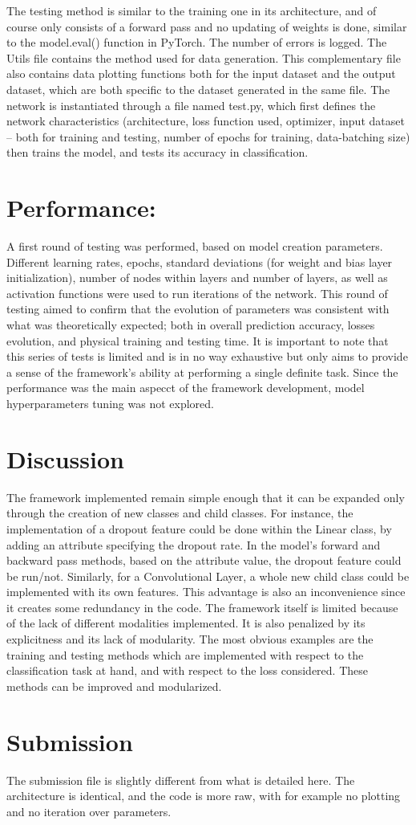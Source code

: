 \documentclass[10pt, a4paper]{article}
\begin{document}
The testing method is similar to the training one in its architecture, and of course only consists of a forward pass and no updating of weights is done, similar to the model.eval() function in PyTorch. The number of errors is logged. 
The Utils file contains the method used for data generation. This complementary file also contains data plotting functions both for the input dataset and the output dataset, which are both specific to the dataset generated in the same file.
The network is instantiated through a file named test.py, which first defines the network characteristics (architecture, loss function used, optimizer, input dataset -- both for training and testing, number of epochs for training, data-batching size) then trains the model, and tests its accuracy in classification. 


\section{Performance:}A first round of testing was performed, based on model creation parameters. Different  learning rates, epochs, standard deviations (for weight and bias layer initialization), number of nodes within layers and number of layers, as well as activation functions were used to run iterations of the network. This round of testing aimed to confirm that the evolution of parameters was consistent with what was theoretically expected; both in overall prediction accuracy, losses evolution, and physical training and testing time. 
It is important to note that this series of tests is limited and is in no way exhaustive but only aims to provide a sense of the framework's ability at performing a single definite task.
Since the performance was the main aspecct of the framework development, model hyperparameters tuning was not explored.

\section{Discussion}The framework implemented remain simple enough that it can be expanded only through the creation of new classes and child classes. For instance, the implementation of a dropout feature could be done within the Linear class, by adding an attribute specifying the dropout rate. In the model's forward and backward pass methods, based on the attribute value, the dropout feature could be run/not. Similarly, for a Convolutional Layer, a whole new child class could be implemented with its own features. 
This advantage is also an inconvenience since it creates some redundancy in the code. 
The framework itself is limited because of the lack of different modalities implemented. It is also penalized by its explicitness and its lack of modularity.
The most obvious examples are the training and testing methods which are implemented with respect to the classification task at hand, and with respect to the loss considered. These methods can be improved and modularized. 

\section{Submission} The submission file is slightly different from what is detailed here. The architecture is identical, and the code is more raw, with for example no plotting and no iteration over parameters. 
\end{document}
